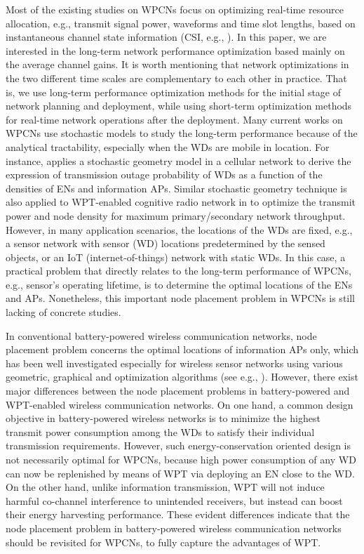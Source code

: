 \documentclass[journal, draftcls, one column, 12pt]{IEEEtran}
\begin{document}
Most of the existing studies on WPCNs focus on optimizing real-time resource allocation, e.g., transmit signal power, waveforms and time slot lengths, based on instantaneous channel state information (CSI, e.g., \cite{2014:Ju1,2014:Liu2,2014:Ju2}). In this paper, we are interested in the long-term network performance optimization based mainly on the average channel gains. It is worth mentioning that network optimizations in the two different time scales are complementary to each other in practice. That is, we use long-term performance optimization methods for the initial stage of network planning and deployment, while using short-term optimization methods for real-time network operations after the deployment. Many current works on WPCNs use stochastic models to study the long-term performance because of the analytical tractability, especially when the WDs are mobile in location. For instance, \cite{2014:Huang1} applies a stochastic geometry model in a cellular network to derive the expression of transmission outage probability of WDs as a function of the densities of ENs and information APs. Similar stochastic geometry technique is also applied to WPT-enabled cognitive radio network in \cite{2014:Lee1} to optimize the transmit power and node density for maximum primary/secondary network throughput. However, in many application scenarios, the locations of the WDs are fixed, e.g., a sensor network with sensor (WD) locations predetermined by the sensed objects, or an IoT (internet-of-things) network with static WDs. In this case, a practical problem that directly relates to the long-term performance of WPCNs, e.g., sensor's operating lifetime, is to determine the optimal locations of the ENs and APs. Nonetheless, this important node placement problem in WPCNs is still lacking of concrete studies.

In conventional battery-powered wireless communication networks, node placement problem concerns the optimal locations of information APs only, which has been well investigated especially for wireless sensor networks using various geometric, graphical and optimization algorithms (see e.g., \cite{2005:Pan,2004:Bogdanov,2007:Akkaya,2003:Gandham,2010:Lin}). However, there exist major differences between the node placement problems in battery-powered and WPT-enabled wireless communication networks. On one hand, a common design objective in battery-powered wireless networks is to minimize the highest transmit power consumption among the WDs to satisfy their individual transmission requirements. However, such energy-conservation oriented design is not necessarily optimal for WPCNs, because high power consumption of any WD can now be replenished by means of WPT via deploying an EN close to the WD. On the other hand, unlike information transmission, WPT will not induce harmful co-channel interference to unintended receivers, but instead can boost their energy harvesting performance. These evident differences indicate that the node placement problem in battery-powered wireless communication networks should be revisited for WPCNs, to fully capture the advantages of WPT.
\end{document}

